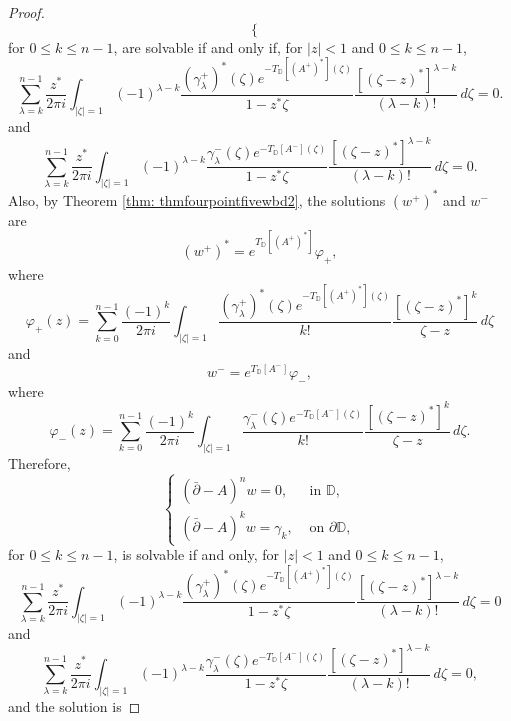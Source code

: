 \documentclass[12pt,reqno]{amsart}
\theoremstyle{definition}
\theoremstyle{remark}
\newcommand{\p}{\partial}
\newcommand{\dbar}{\bar\partial}
\newcommand{\disk}{\mathbb{D}}
\begin{document}
\begin{proof}
\[\begin{cases}
                    \end{cases}
                \]
                for $0 \leq k \leq n-1$, are solvable if and only if, for $|z| < 1$  and $0 \leq k \leq n-1$,
            \[
                \sum_{\lambda = k}^{n-1}\frac{z^*}{2\pi i} \int_{|\zeta| = 1} (-1)^{\lambda - k} \frac{(\gamma^+_\lambda)^*(\zeta)e^{-T_\disk[(A^+)^*](\zeta)}}{1- z^*\zeta} \frac{[(\zeta - z)^*]^{\lambda- k}}{(\lambda - k)!}\,d\zeta   = 0.
            \]
            and
            \[
                \sum_{\lambda = k}^{n-1}\frac{z^*}{2\pi i} \int_{|\zeta| = 1} (-1)^{\lambda - k} \frac{\gamma^-_\lambda(\zeta)e^{-T_\disk[A^-](\zeta)}}{1- z^*\zeta} \frac{[(\zeta - z)^*]^{\lambda- k}}{(\lambda - k)!}\,d\zeta   = 0.
            \]
            Also, by Theorem \ref{thm: thmfourpointfivewbd2}, the solutions $(w^+)^*$ and $w^-$ are 
            \[
                (w^+)^* = e^{T_\disk[(A^+)^*]}  \varphi_+, 
            \]
            where
            \[
                \varphi_+(z) =  \sum_{k=0}^{n-1} \frac{(-1)^k}{2\pi i} \int_{|\zeta| = 1} \frac{(\gamma^+_\lambda)^*(\zeta)e^{-T_\disk[(A^+)^*](\zeta)}}{k!} \frac{[(\zeta - z)^*]^k}{\zeta - z}\,d\zeta 
            \]
            and 
            \[
                w^- = e^{T_\disk[A^-]}  \varphi_-, 
            \]
            where
            \[
                \varphi_-(z) =  \sum_{k=0}^{n-1} \frac{(-1)^k}{2\pi i} \int_{|\zeta| = 1} \frac{\gamma^-_\lambda(\zeta)e^{-T_\disk[A^-](\zeta)}}{k!} \frac{[(\zeta - z)^*]^k}{\zeta - z}\,d\zeta .
            \]
            Therefore, 
            \[
                    \begin{cases}
                        (\dbar-A)^n w = 0, & \text{ in } \disk,\\
                        (\dbar - A)^k w = \gamma_k, & \text{ on } \p\disk,
                    \end{cases}
                \]
                for $0 \leq k \leq n-1$, is solvable if and only, for $|z| < 1$  and $0 \leq k \leq n-1$,
                \[
                    \sum_{\lambda = k}^{n-1}\frac{z^*}{2\pi i} \int_{|\zeta| = 1} (-1)^{\lambda - k} \frac{(\gamma_\lambda^+)^*(\zeta)e^{-T_\disk[(A^+)^*](\zeta)}}{1- z^*\zeta} \frac{[(\zeta - z)^*]^{\lambda- k}}{(\lambda - k)!}\,d\zeta   = 0
                \]
                and
                \[
                    \sum_{\lambda = k}^{n-1}\frac{z^*}{2\pi i} \int_{|\zeta| = 1} (-1)^{\lambda - k} \frac{\gamma_\lambda^-(\zeta) e^{-T_\disk[A^-](\zeta)}}{1- z^*\zeta} \frac{[(\zeta - z)^*]^{\lambda- k}}{(\lambda - k)!}\,d\zeta   = 0,
                \]
                and the solution is 

\end{proof}
\end{document}
